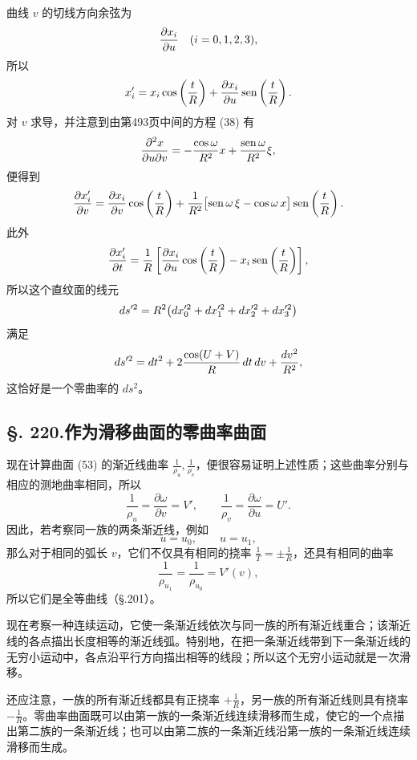 曲线 $v$ 的切线方向余弦为
\[
\frac{\partial x_i}{\partial u}\quad(i=0,1,2,3),
\]
所以
\[
x'_i=x_i\cos\left(\frac tR\right)
+\frac{\partial x_i}{\partial u}
 \operatorname{sen}\left(\frac tR\right).
\]
对 $v$ 求导，并注意到由第493页中间的方程 (38) 有
\[
\frac{\partial^2x}{\partial u\partial v}
=-\frac{\cos\omega}{R^2}x+\frac{\operatorname{sen}\omega}{R^2}\xi,
\]
便得到
\[
\frac{\partial x'_i}{\partial v}
=\frac{\partial x_i}{\partial v}\cos\left(\frac tR\right)
+\frac1{R^2}\bigl[\operatorname{sen}\omega\,\xi-\cos\omega\,x\bigr]
 \operatorname{sen}\left(\frac tR\right).
\]
此外
\[
\frac{\partial x'_i}{\partial t}
=\frac1R\left[
\frac{\partial x_i}{\partial u}
\cos\left(\frac tR\right)-x_i\operatorname{sen}\left(\frac tR\right)
\right],
\]
所以这个直纹面的线元
\[
ds'^2
=R^2\bigl(dx_0'^2+dx_1'^2+dx_2'^2+dx_3'^2\bigr)
\]
满足
\[
ds'^2
=dt^2+2\frac{\cos(U+V)}{R}\,dt\,dv+\frac{dv^2}{R^2},
\]
这恰好是一个零曲率的 $ds^2$。


\subsection*{\S. 220.\quad 作为滑移曲面的零曲率曲面}

现在计算曲面 (53) 的渐近线曲率 $\frac1{\rho_u},\frac1{\rho_v}$，便很容易证明上述性质；这些曲率分别与相应的测地曲率相同，所以
\[
\frac1{\rho_u}=\frac{\partial\omega}{\partial v}=V',
\qquad
\frac1{\rho_v}=\frac{\partial\omega}{\partial u}=U'.
\]
因此，若考察同一族的两条渐近线，例如
\[
u=u_0,
\qquad
u=u_1,
\]
那么对于相同的弧长 $v$，它们不仅具有相同的挠率 $\frac1T=\pm\frac1R$，还具有相同的曲率
\[
\frac1{\rho_{u_1}}=\frac1{\rho_{u_0}}=V'(v),
\]
所以它们是全等曲线（\S.201）。

现在考察一种连续运动，它使一条渐近线依次与同一族的所有渐近线重合；该渐近线的各点描出长度相等的渐近线弧。特别地，在把一条渐近线带到下一条渐近线的无穷小运动中，各点沿平行方向描出相等的线段；所以这个无穷小运动就是一次滑移。

还应注意，一族的所有渐近线都具有正挠率 $+\frac1R$，另一族的所有渐近线则具有挠率 $-\frac1R$。零曲率曲面既可以由第一族的一条渐近线连续滑移而生成，使它的一个点描出第二族的一条渐近线；也可以由第二族的一条渐近线沿第一族的一条渐近线连续滑移而生成。

